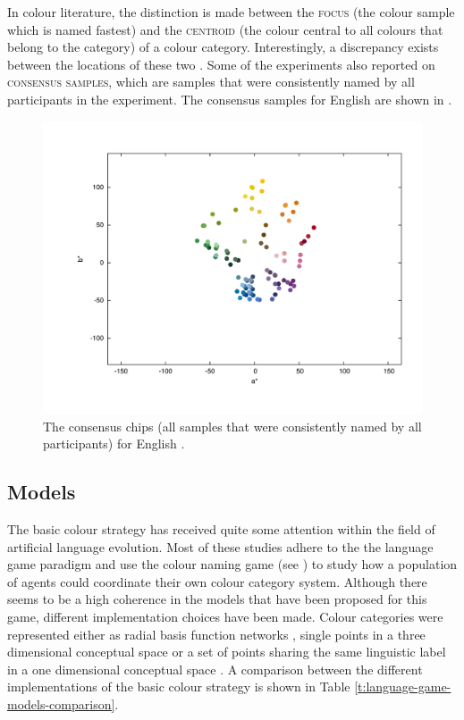 In colour literature, the distinction is made between the \textsc{focus}
(the colour sample which is named fastest) and the \textsc{centroid}
(the colour central to all colours that belong to the category) of a
colour category. Interestingly, a discrepancy exists between the
locations of these two \citep{sturges95location}. Some of the
experiments also reported on \textsc{consensus samples}, which are samples that were
consistently named by all participants in the experiment. The
consensus samples for English \citep{sturges95location} are shown in
.

\begin{figure}[htbp]
  \begin{center}
    \includegraphics[width=.8\textwidth]{./basic-strategy/figures/sturges-consensus-chips.pdf}
    \caption[Consensus chips for English]{The consensus chips (all
      samples that were consistently named by all participants) for
      English \citep{sturges95location}.}
    \label{f:basic-consensus-chips-english}
  \end{center}
\end{figure}

\subsection{Models}

The basic colour strategy has received quite some attention
within the field of artificial language evolution. Most of these
studies adhere to the the language game paradigm and use the colour
naming game (see ) to study
how a population of agents could coordinate their own colour category
system. Although there seems to be a high coherence in the models that
have been proposed for this game, different implementation choices
have been made. Colour categories were represented either as radial
basis function networks \citep{steels05coordinating}, single points in
a three dimensional conceptual space \citep{belpaeme05explaining,
  belpaeme07language} or a set of points sharing the same linguistic
label in a one dimensional conceptual space \citep{puglisi08cultural,
  baronchelli10modeling}. A comparison between the different
implementations of the basic colour strategy is shown in Table
\ref{t:language-game-models-comparison}.

